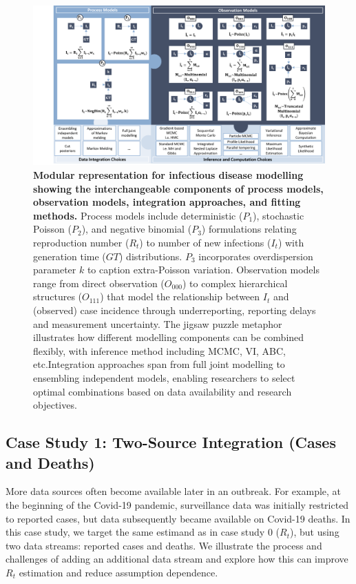 \documentclass{article}
\begin{document}
\begin{figure}[htbp]
    \centering
    \includegraphics[width=\textwidth]{figures/case_study_puzzle_complete.png}
    \caption{\textbf{Modular representation for infectious disease modelling showing the interchangeable components of process models, observation models, integration approaches, and fitting methods.} Process models include deterministic ($P_1$), stochastic Poisson ($P_2$), and negative binomial ($P_3$) formulations relating reproduction number ($R_t$) to number of new infections ($I_t$) with generation time ($GT$) distributions. $P_3$ incorporates overdispersion parameter $k$ to caption extra-Poisson variation. Observation models range from direct observation ($O_{000}$) to complex hierarchical structures ($O_{111}$) that model the relationship between $I_t$ and (observed) case incidence through underreporting, reporting delays and measurement uncertainty. The jigsaw puzzle metaphor illustrates how different modelling components can be combined flexibly, with inference method including MCMC, VI, ABC, etc.Integration approaches span from full joint modelling to ensembling independent models, enabling researchers to select optimal combinations based on data availability and research objectives. }
    \label{fig:case_study_visual}
\end{figure}





\subsection{Case Study 1: Two-Source Integration (Cases and Deaths)}

More data sources often become available later in an outbreak. For example, at the beginning of the Covid-19 pandemic, surveillance data was initially restricted to reported cases, but data subsequently became available on Covid-19 deaths. In this case study, we target the same estimand as in case study 0 ($R_t$), but using two data streams: reported cases and deaths. We illustrate the process and challenges of adding an additional data stream and explore how this can improve $R_t$ estimation and reduce assumption dependence.
\end{document}
